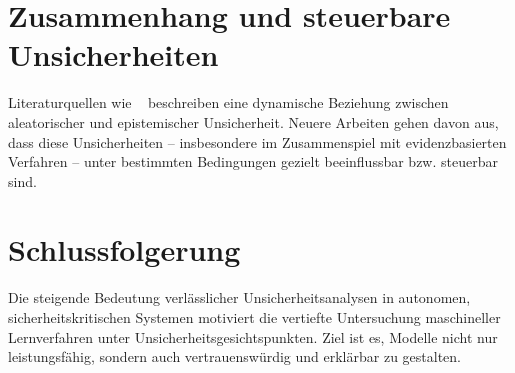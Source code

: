 \section{Zusammenhang und steuerbare Unsicherheiten}

Literaturquellen wie ~\parencite{ArthurHoarau2025} beschreiben eine dynamische Beziehung zwischen aleatorischer und epistemischer Unsicherheit. Neuere Arbeiten gehen davon aus, dass diese Unsicherheiten – insbesondere im Zusammenspiel mit evidenzbasierten Verfahren – unter bestimmten Bedingungen gezielt beeinflussbar bzw. steuerbar sind.

\section{Schlussfolgerung}

Die steigende Bedeutung verlässlicher Unsicherheitsanalysen in autonomen, sicherheitskritischen Systemen motiviert die vertiefte Untersuchung maschineller Lernverfahren unter Unsicherheitsgesichtspunkten. Ziel ist es, Modelle nicht nur leistungsfähig, sondern auch vertrauenswürdig und erklärbar zu gestalten.
